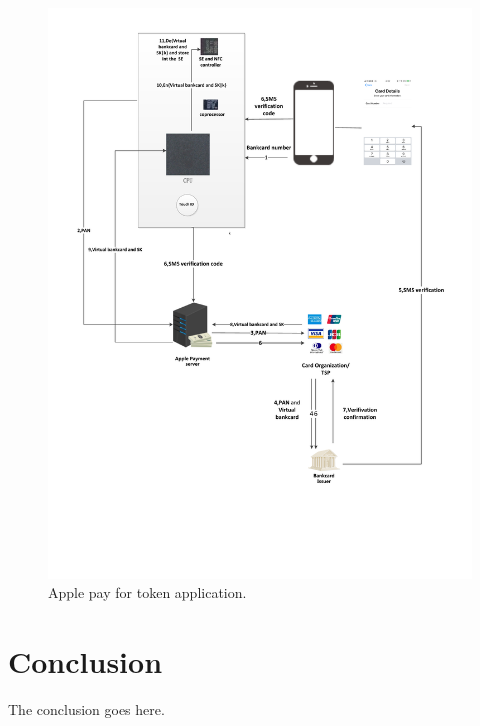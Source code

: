\documentclass[journal]{IEEEtran}
\begin{document}
\begin{figure}[htbp]
\centerline{\includegraphics[scale=0.6]{iphone_tsp.pdf}}
\caption{Apple pay for token application.}
\label{fig}
\end{figure}





\section{Conclusion}
The conclusion goes here.





\end{document}
